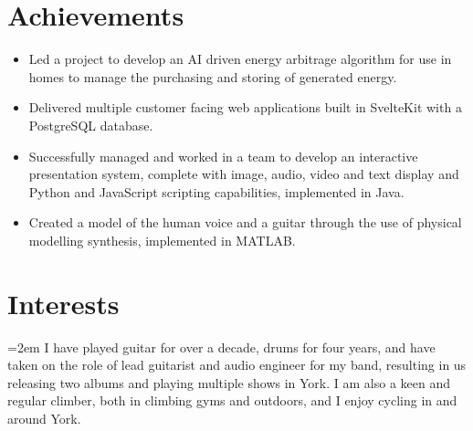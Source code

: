 \documentclass[12pt]{article} %
\newcommand{\interests}[1]{
  \vspace*{0.5em}
  \noindent\hangindent=2em\hangafter=0 \small #1 
}
\begin{document}
\section*{Achievements}
\begin{itemize}
  \item Led a project to develop an AI driven energy arbitrage algorithm for use in homes to manage the purchasing and storing of generated energy.
  \item Delivered multiple customer facing web applications built in SvelteKit with a PostgreSQL database.
  \item Successfully managed and worked in a team to develop an interactive presentation system, complete with image, audio, video and text display and Python and JavaScript scripting capabilities, implemented in Java.
  \item Created a model of the human voice and a guitar through the use of physical modelling synthesis, implemented in MATLAB.
\end{itemize}

\section*{Interests}
\interests{I have played guitar for over a decade, drums for four years, and have taken on the role of lead guitarist and audio engineer for my band, resulting in us releasing two albums and playing multiple shows in York. I am also a keen and regular climber, both in climbing gyms and outdoors, and I enjoy cycling in and around York.}
\end{document}
